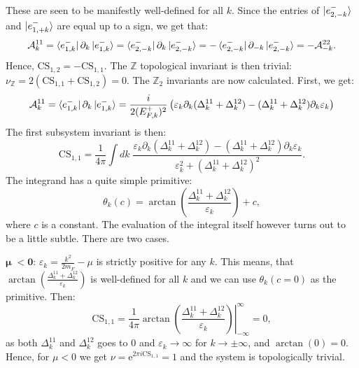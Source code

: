 These are seen to be manifestly well-defined for all $k$. Since the entries of $\ket{e^{-}_{2,-k}}$ and $\ket{e^{-}_{1,+k}}$ are equal up to a sign, we get that:
\begin{equation}
\mathcal{A}^{11}_k = \bra{e^{-}_{1,k}}\partial_k\ket{e^{-}_{1,k}} = \bra{e^{-}_{2,-k}}\partial_k\ket{e^{-}_{2,-k}} = - \bra{e^{-}_{2,-k}}\partial_{-k}\ket{e^{-}_{2,-k}} = -\mathcal{A}^{22}_{-k}. \nonumber
\end{equation}
Hence, $\text{CS}_{1,2} = - \text{CS}_{1,1}$. The $\mathbb{Z}$ topological invariant is then trivial: $\nu_{\mathbb{Z}} = 2(\text{CS}_{1,1} + \text{CS}_{1,2}) = 0$. The $\mathbb{Z}_2$ invariants are now calculated. First, we get:
\begin{equation}
\mathcal{A}^{11}_k = \bra{e^{-}_{1,k}}\partial_k\ket{e^{-}_{1,k}} = \frac{i}{2(E^{+}_{F,k})^2}\left(\varepsilon_k\partial_k(\Delta^{11}_k + \Delta^{12}_k) - (\Delta^{11}_k + \Delta^{12}_k)\partial_k \varepsilon_k\right) \nonumber
\end{equation}
The first subsystem invariant is then:
\begin{equation}
\text{CS}_{1,1} = \frac{1}{4\pi}\int dk \; \frac{\varepsilon_k\partial_k(\Delta^{11}_k + \Delta^{12}_k) - (\Delta^{11}_k + \Delta^{12}_k)\partial_k \varepsilon_k}{\varepsilon_k^2 + (\Delta^{11}_k + \Delta^{12}_k)^2}.
\label{eq.CS11integralform}
\end{equation}
The integrand has a quite simple primitive:
\begin{equation}
\theta_k(c) = \arctan\left(\frac{\Delta^{11}_k + \Delta^{12}_k }{\varepsilon_k}\right) + c,
\label{eq.thetak.def}
\end{equation}
where $c$ is a constant. The evaluation of the integral itself however turns out to be a little subtle. There are two cases.

$\boldsymbol\mu \;\mathbf{< 0}$: $\varepsilon_k = \frac{k^2}{2m_F} - \mu$ is strictly positive for any $k$. This means, that $\arctan\left(\frac{\Delta^{11}_k + \Delta^{12}_k }{\varepsilon_k}\right)$ is well-defined for all $k$ and we can use $\theta_k(c = 0)$ as the primitive. Then:
\begin{equation}
\text{CS}_{1,1} = \frac{1}{4\pi}\left.\arctan\left(\frac{\Delta^{11}_k + \Delta^{12}_k }{\varepsilon_k}\right)\right|^{\infty}_{-\infty} = 0, \nonumber
\end{equation}
as both $\Delta^{11}_k$ and $\Delta^{12}_k$ goes to $0$ and $\varepsilon_k \to \infty$ for $k\to \pm \infty$, and $\arctan(0) = 0$. Hence, for $\mu < 0$ we get $\nu = \text{e}^{2\pi i\text{CS}_{1,1}} = 1$ and the system is topologically trivial. 

